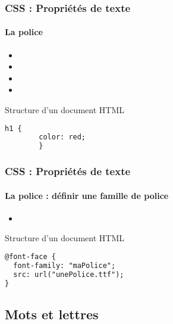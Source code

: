 \documentclass[xcolor=table]{beamer}
\begin{document}
\begin{frame}[fragile]
\frametitle{CSS : Propriétés de texte}
\framesubtitle{La police}

\begin{minipage}{0.60\textwidth}
	\begin{itemize}
		\item {}
		\item {}
		\item {}
		\item {}
	\end{itemize}
\end{minipage}
%
\begin{minipage}{0.38\textwidth}
	\begin{block}{Structure d'un document HTML}
		\lstset{escapeinside=**}
		\scriptsize\bfseries
		\begin{lstlisting}[language={html}]
		h1 {
		color: red;
		}
		\end{lstlisting}
	\end{block}
\end{minipage}
\end{frame}

\begin{frame}[fragile]
\frametitle{CSS : Propriétés de texte}
\framesubtitle{La police : définir une famille de police}

\begin{minipage}{0.60\textwidth}
	\begin{itemize}
		\item {}
	\end{itemize}
\end{minipage}
%
\begin{minipage}{0.38\textwidth}
\begin{block}{Structure d'un document HTML}
\lstset{escapeinside=**}
\scriptsize\bfseries
\begin{lstlisting}[language={html}]
@font-face {
  font-family: "maPolice";
  src: url("unePolice.ttf");
}
\end{lstlisting}
\end{block}
\end{minipage}
\end{frame}

\subsection{Mots et lettres}
\end{document}
